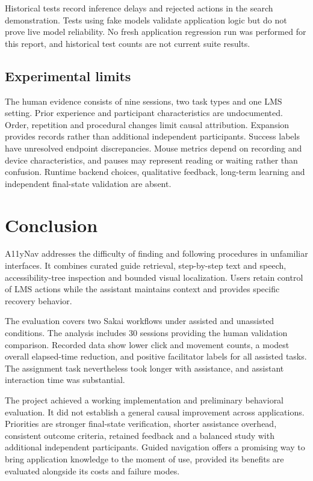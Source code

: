 \documentclass[11pt,a4paper]{article}
\begin{document}
Historical tests record inference delays and rejected actions in the search demonstration. Tests using fake models validate application logic but do not prove live model reliability. No fresh application regression run was performed for this report, and historical test counts are not current suite results.

\subsection{Experimental limits}
The human evidence consists of nine sessions, two task types and one LMS setting. Prior experience and participant characteristics are undocumented. Order, repetition and procedural changes limit causal attribution. Expansion provides records rather than additional independent participants. Success labels have unresolved endpoint discrepancies. Mouse metrics depend on recording and device characteristics, and pauses may represent reading or waiting rather than confusion. Runtime backend choices, qualitative feedback, long-term learning and independent final-state validation are absent.

\section{Conclusion}
A11yNav addresses the difficulty of finding and following procedures in unfamiliar interfaces. It combines curated guide retrieval, step-by-step text and speech, accessibility-tree inspection and bounded visual localization. Users retain control of LMS actions while the assistant maintains context and provides specific recovery behavior.

The evaluation covers two Sakai workflows under assisted and unassisted conditions. The analysis includes 30 sessions providing the human validation comparison. Recorded data show lower click and movement counts, a modest overall elapsed-time reduction, and positive facilitator labels for all assisted tasks. The assignment task nevertheless took longer with assistance, and assistant interaction time was substantial.

The project achieved a working implementation and preliminary behavioral evaluation. It did not establish a general causal improvement across applications. Priorities are stronger final-state verification, shorter assistance overhead, consistent outcome criteria, retained feedback and a balanced study with additional independent participants. Guided navigation offers a promising way to bring application knowledge to the moment of use, provided its benefits are evaluated alongside its costs and failure modes.
\end{document}
